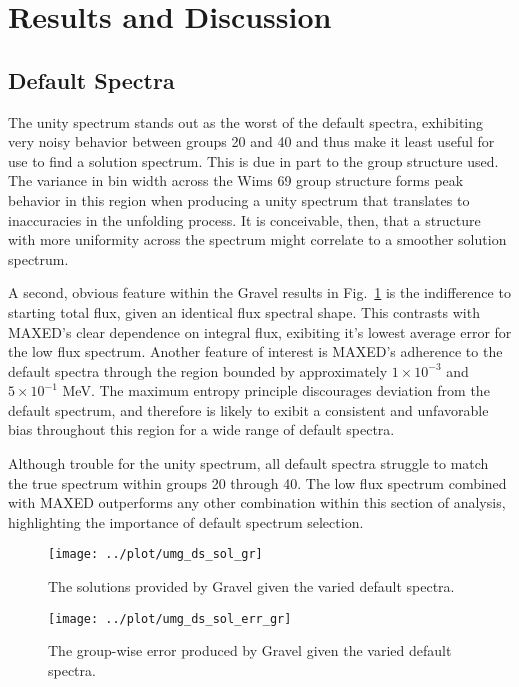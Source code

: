 \documentclass[journal]{IEEEtran}
\newcommand{\FIG}[1]{Fig.~\ref{#1}}               %
\begin{document}
\section{Results and Discussion}

\subsection{Default Spectra}

The unity spectrum stands out as the worst of the default spectra, exhibiting very noisy behavior between groups 20 and 40 and thus make it least useful for use to find a solution spectrum.
This is due in part to the group structure used.
The variance in bin width across the Wims 69 group structure forms peak behavior in this region when producing a unity spectrum that translates to inaccuracies in the unfolding process.
It is conceivable, then, that a structure with more uniformity across the spectrum might correlate to a smoother solution spectrum.

A second, obvious feature within the Gravel results in \FIG{fig:ds_sol_gr} is the indifference to starting total flux, given an identical flux spectral shape.
This contrasts with MAXED's clear dependence on integral flux, exibiting it's lowest average error for the low flux spectrum.
Another feature of interest is MAXED's adherence to the default spectra through the region bounded by approximately $1 \times 10^{-3}$ and $5 \times 10^{-1}$ MeV.
The maximum entropy principle discourages deviation from the default spectrum, and therefore is likely to exibit a consistent and unfavorable bias throughout this region for a wide range of default spectra.

Although trouble for the unity spectrum, all default spectra struggle to match the true spectrum within groups 20 through 40.
The low flux spectrum combined with MAXED outperforms any other combination within this section of analysis, highlighting the importance of default spectrum selection.


\begin{figure}[h!tb]
  \centering
  \texttt{[image: ../plot/umg\_ds\_sol\_gr]}
  \caption{The solutions provided by Gravel given the varied default spectra.}
  \label{fig:ds_sol_gr}
\end{figure}

\begin{figure}[h!tb]
  \centering
  \texttt{[image: ../plot/umg\_ds\_sol\_err\_gr]}
  \caption{The group-wise error produced by Gravel given the varied default spectra.}
  \label{fig:ds_err_gr}
\end{figure}
\end{document}
